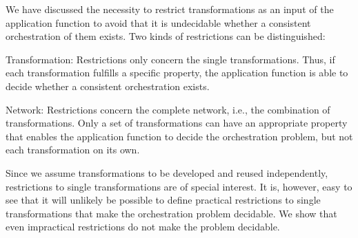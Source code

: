 We have discussed the necessity to restrict transformations as an input of the application function to avoid that it is undecidable whether a consistent orchestration of them exists. %
Two kinds of restrictions can be distinguished:
\begin{properdescription}
    \item[Transformation:] Restrictions only concern the single transformations. Thus, if each transformation fulfills a specific property, the application function is able to decide whether a consistent orchestration exists.
    \item[Network:] Restrictions concern the complete network, i.e., the combination of transformations. Only a set of transformations can have an appropriate property that enables the application function to decide the orchestration problem, but not each transformation on its own.
\end{properdescription}

Since we assume transformations to be developed and reused independently, restrictions to single transformations are of special interest.
It is, however, easy to see that it will unlikely be possible to define practical restrictions to single transformations that make the orchestration problem decidable.
We show that even impractical restrictions do not make the problem decidable.




